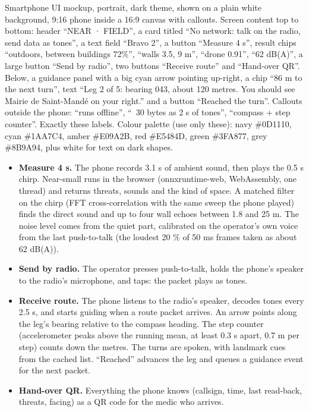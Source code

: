 {Smartphone UI mockup, portrait, dark theme, shown on a plain white background, 9:16 phone inside a 16:9 canvas with
callouts. Screen content top to bottom: header ``NEAR · FIELD'', a card titled ``No network: talk on the radio, send data as
tones'', a text field ``Bravo 2'', a button ``Measure 4 s'', result chips ``outdoors, between buildings 72\%'', ``walls 3.5, 9 m'',
``drone 0.91'', ``62 dB(A)'', a large button ``Send by radio'', two buttons ``Receive route'' and ``Hand-over QR''. Below, a
guidance panel with a big cyan arrow pointing up-right, a chip ``86 m to the next turn'', text ``Leg 2 of 5: bearing 043, about 120
metres. You should see Mairie de Saint-Mandé on your right.'' and a button ``Reached the turn''. Callouts outside the phone:
``runs offline'', ``~30 bytes as 2 s of tones'', ``compass + step counter''. Exactly these labels. Colour palette (use only these): navy \#0D1110, cyan \#1AA7C4, amber \#E09A2B, red \#E5484D, green \#3FA877, grey \#8B9A94, plus white for text on dark shapes.}

\begin{itemize}
  \item \textbf{Measure 4 s.} The phone records 3.1 s of ambient sound, then plays the 0.5 s chirp. Near-small runs in the browser
        (onnxruntime-web, WebAssembly, one thread) and returns threats, sounds and the kind of space. A matched filter on the chirp
        (FFT cross-correlation with the same sweep the phone played) finds the direct sound and up to four wall echoes between
        1.8 and 25 m. The noise level comes from the quiet part, calibrated on the operator's own voice from the last
        push-to-talk (the loudest 20 \% of 50 ms frames taken as about 62 dB(A)).
  \item \textbf{Send by radio.} The operator presses push-to-talk, holds the phone's speaker to the radio's microphone, and
        taps: the packet plays as tones.
  \item \textbf{Receive route.} The phone listens to the radio's speaker, decodes tones every 2.5 s, and starts guiding when
        a route packet arrives. An arrow points along the leg's bearing relative to the compass heading. The step counter
        (accelerometer peaks above the running mean, at least 0.3 s apart, 0.7 m per step) counts down the metres. The turns
        are spoken, with landmark cues from the cached list. ``Reached'' advances the leg and queues a guidance event for
        the next packet.
  \item \textbf{Hand-over QR.} Everything the phone knows (callsign, time, last read-back, threats, facing) as a QR code for the
        medic who arrives.
\end{itemize}


